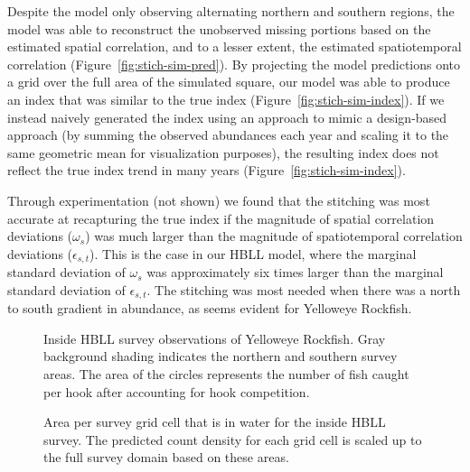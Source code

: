 \documentclass[11pt]{book}
\begin{document}
Despite the model only observing alternating northern and southern regions, the model was able to reconstruct the unobserved missing portions based on the estimated spatial correlation, and to a lesser extent, the estimated spatiotemporal correlation (Figure~\ref{fig:stich-sim-pred}). By projecting the model predictions onto a grid over the full area of the simulated square, our model was able to produce an index that was similar to the true index (Figure~\ref{fig:stich-sim-index}). If we instead naively generated the index using an approach to mimic a design-based approach (by summing the observed abundances each year and scaling it to the same geometric mean for visualization purposes), the resulting index does not reflect the true index trend in many years (Figure~\ref{fig:stich-sim-index}).

Through experimentation (not shown) we found that the stitching was most accurate at recapturing the true index if the magnitude of spatial correlation deviations (\(\omega_s\)) was much larger than the magnitude of spatiotemporal correlation deviations (\(\epsilon_{s,t}\)). This is the case in our HBLL model, where the marginal standard deviation of \(\omega_s\) was approximately six times larger than the marginal standard deviation of \(\epsilon_{s,t}\). The stitching was most needed when there was a north to south gradient in abundance, as seems evident for Yelloweye Rockfish.
\begin{figure}[htb]

{\centering {} 

}

\caption{Inside HBLL survey observations of Yelloweye Rockfish. Gray background shading indicates the northern and southern survey areas. The area of the circles represents the number of fish caught per hook after accounting for hook competition.}\label{fig:hbll-raw}
\end{figure}
\begin{figure}[htb]

{\centering {} 

}

\caption{Area per survey grid cell that is in water for the inside HBLL survey. The predicted count density for each grid cell is scaled up to the full survey domain based on these areas.}\label{fig:hbll-area-grid}
\end{figure}
\end{document}
